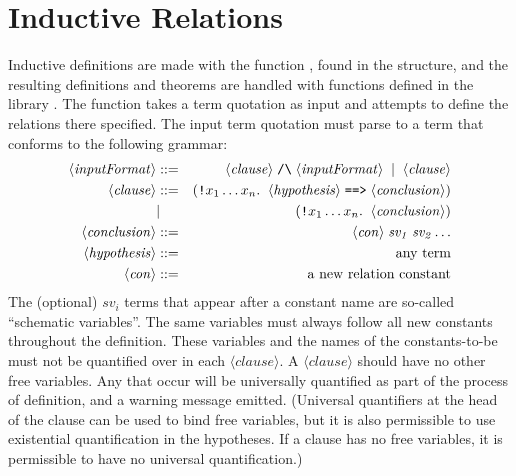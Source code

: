 \section{Inductive Relations}

Inductive definitions are made with the function , found
in the  structure, and the resulting definitions and 
theorems are handled with functions defined in the library 
. The  function takes a
term quotation as input and attempts to define the relations there
specified.  The input term quotation must parse to a term that
conforms to the following grammar:
\newcommand{\nonterm}[1]{\ensuremath{\langle\mathit{#1}\rangle}}
\begin{eqnarray*}
   \nonterm{inputFormat} &::=& \nonterm{clause} \;\holtxt{/\bk}\; \nonterm{inputFormat} \;\;|\;\; \nonterm{clause}\\
   \nonterm{clause}       &::=& (\holtxt{!}x_1 \dots
   x_n. \;\;\nonterm{hypothesis} \;\holtxt{==>}
   \;\nonterm{conclusion})\\
   &|& (\holtxt{!}x_1\dots x_n.\;\;\nonterm{conclusion})\\
   \nonterm{conclusion}   &::=& \nonterm{con} \;\mathit{sv_1}\; \mathit{sv_2} \dots\\
   \nonterm{hypothesis}   &::=& \mbox{any term}\\
   \nonterm{con}          &::=& \mbox{a new relation constant}
\end{eqnarray*}
The (optional) $\mathit{sv}_i$ terms that appear after a constant name
are so-called ``schematic variables''.  The same variables must always
follow all new constants throughout the definition.  These variables
and the names of the constants-to-be must not be quantified over in
each {\nonterm{clause}}.  A {\nonterm{clause}} should have no other
free variables.  Any that occur will be universally quantified as part
of the process of definition, and a warning message emitted.
(Universal quantifiers at the head of the clause can be used to bind
free variables, but it is also permissible to use existential
quantification in the hypotheses.  If a clause has no free variables,
it is permissible to have no universal quantification.)

